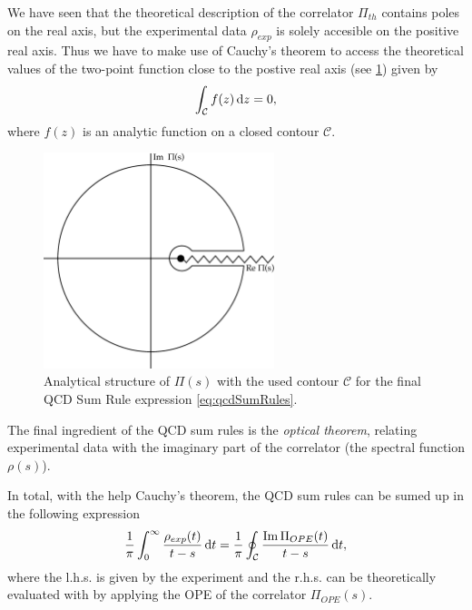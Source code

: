 \documentclass[../../index.tex]{subfiles}
\begin{document}
We have seen that the theoretical description of the correlator $\Pi_{th}$
contains poles on the real axis, but the experimental data $\rho_{exp}$ is
solely accesible on the positive real axis. Thus we have to make use of Cauchy's
theorem to access the theoretical values of the two-point function close to the
postive real axis (see \cref{fig:correlatorComplexContour}) given by
\begin{equation}
  \label{eq:cauchysTheorem}
  \int_{\mathcal{C}} f(z) \dif z = 0,
\end{equation}
where $f(z)$ is an analytic function on a closed contour $\mathcal{C}$.
\begin{figure}[h]
  \centering
  \label{fig:correlatorComplexContour}
  \includegraphics[width=0.6\textwidth]{./images/correlatorComplexContour.eps}
  \caption{Analytical structure of $\Pi(s)$ with the used contour $\mathcal{C}$
    for the final QCD Sum Rule expression \cref{eq:qcdSumRules}.}
\end{figure}

The final ingredient of the QCD sum rules is the \textit{optical theorem},
relating experimental data with the imaginary part of the correlator (the
spectral function $\rho(s)$).

In total, with the help Cauchy's theorem, the QCD sum rules can be sumed up in
the following expression
\begin{equation}
  \label{eq:qcdSumRules}
  \frac{1}{\pi}\int_0^\infty \frac{\rho_{exp}(t)}{t - s}\dif t = \frac{1}{\pi} \oint_{\mathcal{C}} \frac{\Ima \Pi_{OPE}(t)}{t -s}\dif t,
\end{equation}
where the l.h.s. is given by the experiment and the r.h.s. can be theoretically
evaluated with by applying the OPE of the correlator $\Pi_{OPE}(s)$.
\end{document}

